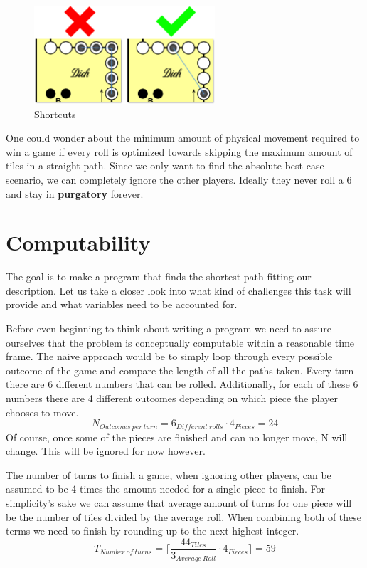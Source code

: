 \documentclass[12pt]{article}
\begin{document}
\begin{figure}[htbp]
    \centering
    \includegraphics[width=0.6\textwidth]{images/Figure2}
    \caption{Shortcuts}
    \label{fig:shortcuts}
\end{figure}

One could wonder about the minimum amount of physical movement required to win a game if every roll is optimized towards skipping the maximum amount of tiles in a straight path. Since we only want to find the absolute best case scenario, we can completely ignore the other players. Ideally they never roll a 6 and stay in \textbf{purgatory} forever.


\section{Computability}\label{sec:computability}
The goal is to make a program that finds the shortest path fitting our description. Let us take a closer look into what kind of challenges this task will provide and what variables need to be accounted for.

Before even beginning to think about writing a program we need to assure ourselves that the problem is conceptually computable within a reasonable time frame.
The naive approach would be to simply loop through every possible outcome of the game and compare the length of all the paths
taken.
Every turn there are 6 different numbers that can be rolled. Additionally, for each of these 6 numbers there are 4 different outcomes depending on which piece the player chooses to move.
\[
    N_{Outcomes~per~turn} = 6_{Different~rolls} \cdot 4_{Pieces} = 24
\]
Of course, once some of the pieces are finished and can no longer move, N will change. This will be ignored for now however.

The number of turns to finish a game, when ignoring other players, can be assumed to be 4 times the amount needed for a single piece to finish. For simplicity's sake we can assume that average amount of turns for one piece will be the number of tiles divided by the average roll. When combining both of these terms we need to finish by rounding up to the next highest integer.
\[
    T_{Number~of~turns} =  \lceil \frac{44_{Tiles}}{3_{Average~Roll}} \cdot 4_{Pieces} \rceil
    =  59
\]
\end{document}
